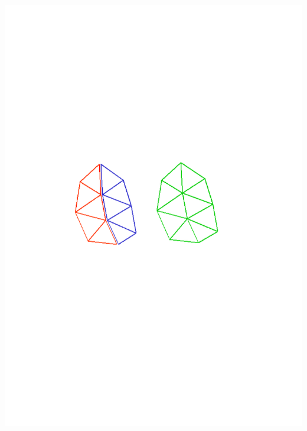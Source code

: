 \documentclass[14pt]{beamer}
\begin{document}
\begin{frame}
\begin{itemize}
\end{itemize}
\includegraphics[scale=0.45, trim = -100 0 0 250 ]{stitch00.png}

\end{frame}
\end{document}
